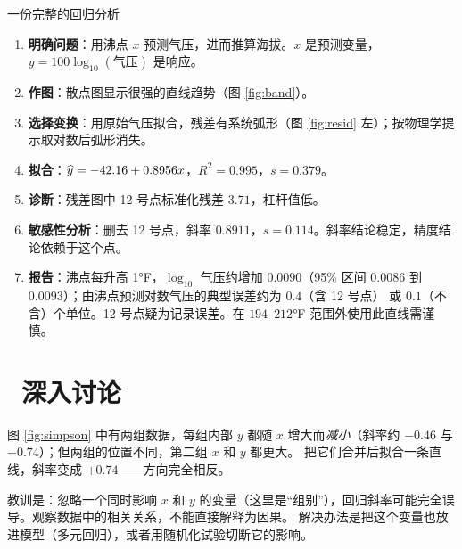 \begin{casestudy}{一份完整的回归分析}
\begin{enumerate}
\item \textbf{明确问题}：用沸点 $x$ 预测气压，进而推算海拔。$x$ 是预测变量，$y=100\log_{10}(\text{气压})$ 是响应。
\item \textbf{作图}：散点图显示很强的直线趋势（图 \ref{fig:band}）。
\item \textbf{选择变换}：用原始气压拟合，残差有系统弧形（图 \ref{fig:resid} 左）；按物理学提示取对数后弧形消失。
\item \textbf{拟合}：$\widehat{y}=-42.16+0.8956x$，$R^2=0.995$，$s=0.379$。
\item \textbf{诊断}：残差图中 12 号点标准化残差 $3.71$，杠杆值低。
\item \textbf{敏感性分析}：删去 12 号点，斜率 $0.8911$，$s=0.114$。斜率结论稳定，精度结论依赖于这个点。
\item \textbf{报告}：沸点每升高 1°F，$\log_{10}$ 气压约增加 $0.0090$（95\% 区间 $0.0086$ 到 $0.0093$）；由沸点预测对数气压的典型误差约为 $0.4$（含 12 号点）
或 $0.1$（不含）个单位。12 号点疑为记录误差。在 $194$–$212$°F 范围外使用此直线需谨慎。
\end{enumerate}
\end{casestudy}

\section{\starmark\ 深入讨论}

\begin{deeper}
图 \ref{fig:simpson} 中有两组数据，每组内部 $y$ 都随 $x$ 增大而\emph{减小}（斜率约 $-0.46$ 与 $-0.74$）；但两组的位置不同，第二组 $x$ 和 $y$ 都更大。
把它们合并后拟合一条直线，斜率变成 $+0.74$——方向完全相反。

\begin{center}
\label{fig:simpson}
\end{center}

教训是：忽略一个同时影响 $x$ 和 $y$ 的变量（这里是“组别”），回归斜率可能完全误导。观察数据中的相关关系，不能直接解释为因果。
解决办法是把这个变量也放进模型（多元回归），或者用随机化试验切断它的影响。
\end{deeper}

